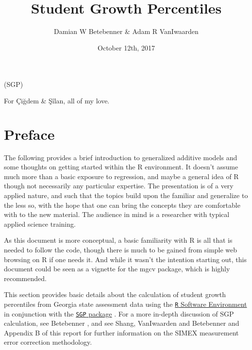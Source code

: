 \documentclass[]{tufte-book}
\title{Student Growth Percentiles}
\author{Damian W Betebenner \& Adam R VanIwaarden}
\date{October 12th, 2017}
\newenvironment{License}
  {%
   \thispagestyle{empty}%
   \vspace*{\stretch{3}}%
   \raggedright          %
  }
  {\par %
   \vspace{\stretch{1}} %
   \clearpage           %
  }
\begin{document}
\maketitle


(SGP)

\begin{License}
For \c{C}i\u{g}dem \& \c{S}\^{i}lan, all of my love.
\end{License}

{
\setcounter{tocdepth}{1}
\tableofcontents
}

\chapter{Preface}\label{preface}

The following provides a brief introduction to generalized additive
models and some thoughts on getting started within the R environment. It
doesn't assume much more than a basic exposure to regression, and maybe
a general idea of R though not necessarily any particular expertise. The
presentation is of a very applied nature, and such that the topics build
upon the familiar and generalize to the less so, with the hope that one
can bring the concepts they are comfortable with to the new material.
The audience in mind is a researcher with typical applied science
training.

As this document is more conceptual, a basic familiarity with R is all
that is needed to follow the code, though there is much to be gained
from simple web browsing on R if one needs it. And while it wasn't the
intention starting out, this document could be seen as a vignette for
the {mgcv} package, which is highly recommended.

This section provides basic details about the calculation of student
growth percentiles from Georgia state assessment data using the
\href{http://www.r-project.org/}{\texttt{R} Software Environment}
\citep{Rsoftware} in conjunction with the
\href{https://github.com/CenterForAssessment/SGP}{\texttt{SGP} package}
\citep{sgp2017}. For a more in-depth discussion of SGP calculation, see
Betebenner \citeyearpar{Betebenner:2009}, and see Shang, VanIwaarden and
Betebenner \citeyearpar{ShangVanIBet:2015} and Appendix B of this report
for further information on the SIMEX measurement error correction
methodology.
\end{document}
